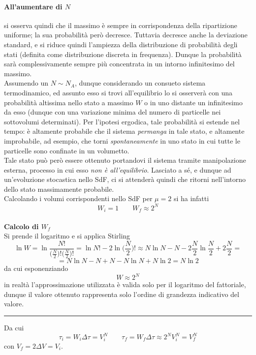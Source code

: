 \documentclass[10pt, oneside]{book}
\newcommand{\infobox}[2]{\vspace{0.5cm}~\\ \textbf{#1} \hrulefill \vspace{0.2cm}\\#2 {}\,\\\hrule \vspace{0.5cm}}
\begin{document}
\paragraph{All'aumentare di $N$} si osserva quindi che il massimo è sempre in corrispondenza della ripartizione uniforme; la sua probabilità però decresce. Tuttavia decresce anche la deviazione standard, e si riduce quindi l'ampiezza della distribuzione di probabilità degli stati (definita come distribuzione discreta in frequenza). Dunque la probabilità sarà complessivamente sempre più concentrata in un intorno infinitesimo del massimo.\\
Assumendo un $N \sim N_A$, dunque considerando un consueto sistema termodinamico, ed assunto esso si trovi all'equilibrio lo si osserverà con una probabilità altissima nello stato a massimo $W$ o in uno distante un infinitesimo da esso (dunque con una variazione minima del numero di particelle nei sottovolumi determinati). Per l'ipotesi ergodica, tale probabilità si estende nel tempo: è altamente probabile che il sistema \textit{permanga} in tale stato, e altamente improbabile, ad esempio, che torni \textit{spontaneamente} in uno stato in cui tutte le particelle sono confinate in un volumetto.\\
Tale stato può però essere ottenuto portandovi il sistema tramite manipolazione esterna, processo in cui esso \textit{non è all'equilibrio}. Lasciato a sé, e dunque ad un'evoluzione stocastica nello SdF, ci si attenderà quindi che ritorni nell'intorno dello stato massimamente probabile.\\
Calcolando i volumi corrispondenti nello SdF per $\mu = 2$ si ha infatti
\[W_i = 1 \qquad W_f \approx 2^N\]
\infobox{Calcolo di $W_f$}{
Si prende il logaritmo e si applica Stirling
\[\ln W = \ln \frac{N!}{\big(\frac{N}{2}\big)!\big(\frac{N}{2}\big)!} = \ln N! - 2 \ln \big(\frac{N}{2}\big)! \approx N \ln N - N - 2 \frac{N}{2} \ln \frac{N}{2} + 2 \frac{N}{2} =\]
\[= N \ln N - N + N - N \ln N + N \ln 2 = N \ln 2\]
da cui esponenziando
\[W \approx 2^N\]
in realtà l'approssimazione utilizzata è valida solo per il logaritmo del fattoriale, dunque il valore ottenuto rappresenta solo l'ordine di grandezza indicativo del valore.
}
Da cui
\[\tau_i = W_i \Delta \tau = V_i^N \qquad \tau_f = W_f \Delta \tau \approx 2^N V_i^N = V_f^N\]
con $V_f = 2 \Delta V = V_i$.
\end{document}
